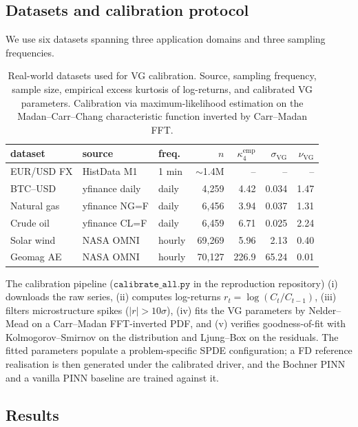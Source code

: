 \documentclass[review,12pt]{elsarticle}
\begin{document}
\subsection{Datasets and calibration protocol}
\label{subsec:datasets}

We use six datasets spanning three application domains and three
sampling frequencies.

\begin{table}[h]
\centering
\caption{Real-world datasets used for VG calibration. Source, sampling
frequency, sample size, empirical excess kurtosis of log-returns, and
calibrated VG parameters. Calibration via maximum-likelihood estimation
on the Madan--Carr--Chang
characteristic function inverted by Carr--Madan FFT.}
\label{tab:datasets}
\begin{tabular}{l l l r r r r}
\toprule
dataset & source & freq.\ & $n$ & $\kappa_4^{\mathrm{emp}}$
    & $\sigma_{\mathrm{VG}}$ & $\nu_{\mathrm{VG}}$ \\
\midrule
EUR/USD FX   & HistData M1   & 1 min & \(\sim\)1.4M & --  & --  & -- \\
BTC--USD    & yfinance daily & daily & 4{,}259   & 4.42 & 0.034 & 1.47 \\
Natural gas  & yfinance NG=F  & daily & 6{,}456   & 3.94 & 0.037 & 1.31 \\
Crude oil   & yfinance CL=F  & daily & 6{,}459   & 6.71 & 0.025 & 2.24 \\
Solar wind   & NASA OMNI    & hourly & 69{,}269  & 5.96 & 2.13 & 0.40 \\
Geomag AE   & NASA OMNI    & hourly & 70{,}127  & 226.9 & 65.24 & 0.01 \\
\bottomrule
\end{tabular}
\end{table}

The calibration pipeline (\(\texttt{calibrate\_all.py}\) in the
reproduction repository) (i) downloads the raw series, (ii) computes
log-returns \(r_t = \log(C_t / C_{t-1})\), (iii) filters
microstructure spikes (\(|r| > 10\sigma\)), (iv) fits the VG
parameters by Nelder--Mead on a Carr--Madan FFT-inverted PDF, and
(v) verifies goodness-of-fit with Kolmogorov--Smirnov on the
distribution and Ljung--Box on the residuals. The fitted parameters
populate a problem-specific SPDE configuration; a FD reference
realisation is then generated under the calibrated driver, and the
Bochner PINN and a vanilla PINN baseline are trained against it.

\subsection{Results}
\label{subsec:realworld-results}
\end{document}
